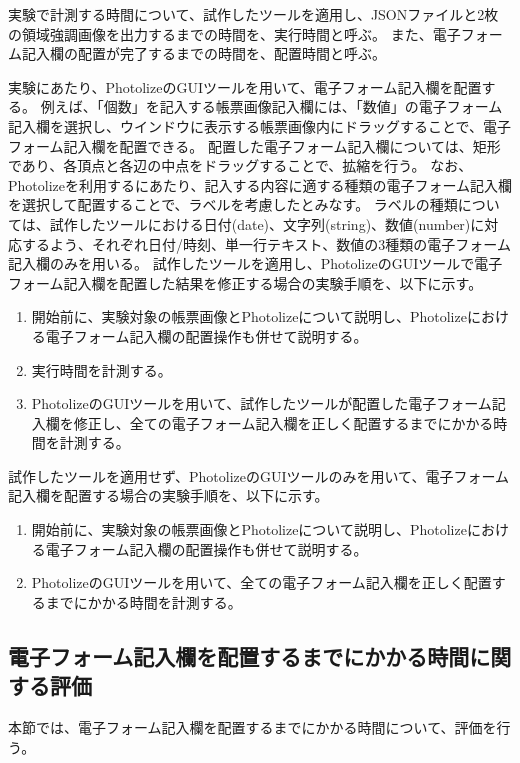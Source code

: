 実験で計測する時間について、試作したツールを適用し、JSONファイルと2枚の領域強調画像を出力するまでの時間を、実行時間と呼ぶ。
また、電子フォーム記入欄の配置が完了するまでの時間を、配置時間と呼ぶ。

実験にあたり、PhotolizeのGUIツールを用いて、電子フォーム記入欄を配置する。
例えば、「個数」を記入する帳票画像記入欄には、「数値」の電子フォーム記入欄を選択し、ウインドウに表示する帳票画像内にドラッグすることで、電子フォーム記入欄を配置できる。
配置した電子フォーム記入欄については、矩形であり、各頂点と各辺の中点をドラッグすることで、拡縮を行う。
なお、Photolizeを利用するにあたり、記入する内容に適する種類の電子フォーム記入欄を選択して配置することで、ラベルを考慮したとみなす。
ラベルの種類については、試作したツールにおける日付(date)、文字列(string)、数値(number)に対応するよう、それぞれ日付/時刻、単一行テキスト、数値の3種類の電子フォーム記入欄のみを用いる。
試作したツールを適用し、PhotolizeのGUIツールで電子フォーム記入欄を配置した結果を修正する場合の実験手順を、以下に示す。

\begin{enumerate}
    \item 開始前に、実験対象の帳票画像とPhotolizeについて説明し、Photolizeにおける電子フォーム記入欄の配置操作も併せて説明する。
    \item 実行時間を計測する。
    \item PhotolizeのGUIツールを用いて、試作したツールが配置した電子フォーム記入欄を修正し、全ての電子フォーム記入欄を正しく配置するまでにかかる時間を計測する。
\end{enumerate}

試作したツールを適用せず、PhotolizeのGUIツールのみを用いて、電子フォーム記入欄を配置する場合の実験手順を、以下に示す。

\begin{enumerate}
    \item 開始前に、実験対象の帳票画像とPhotolizeについて説明し、Photolizeにおける電子フォーム記入欄の配置操作も併せて説明する。
    \item PhotolizeのGUIツールを用いて、全ての電子フォーム記入欄を正しく配置するまでにかかる時間を計測する。
\end{enumerate}

\subsection{電子フォーム記入欄を配置するまでにかかる時間に関する評価}\label{subsec:evalue_required_time}
本節では、電子フォーム記入欄を配置するまでにかかる時間について、評価を行う。


